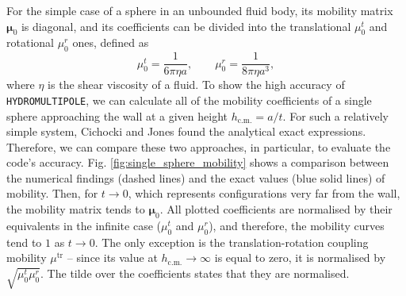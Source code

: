 \documentclass{master_thesis}
\def\code#1{\texttt{#1}}
\begin{document}
For the simple case of a sphere in an unbounded fluid body, its mobility matrix $\boldsymbol{\mu}_0$ is diagonal, and its coefficients can be divided into the translational $\mu^t_0$ and rotational $\mu^r_0$ ones, defined as
\begin{equation}
    \mu^t_0=\frac{1}{6\pi\eta a}, \qquad \mu^r_0=\frac{1}{8\pi\eta a^3},
\label{eqn:sphere_mobility_zero}
\end{equation}
where $\eta$ is the shear viscosity of a fluid. To show the high accuracy of \code{HYDROMULTIPOLE}, we can calculate all of the mobility coefficients of a single sphere approaching the wall at a given height $h_{\textrm{c.m.}}=a/t$. For such a relatively simple system, Cichocki and Jones \cite{cichocki1998} found the analytical exact expressions. Therefore, we can compare these two approaches, in particular, to evaluate the code's accuracy. Fig. \ref{fig:single_sphere_mobility} shows a comparison between the numerical findings (dashed lines) and the exact values (blue solid lines) of mobility. Then, for $t\rightarrow 0$, which represents configurations very far from the wall, the mobility matrix tends to $\bm{\mu}_0$. All plotted coefficients are normalised by their equivalents in the infinite case ($\mu^t_0$ and $\mu^r_0$), and therefore, the mobility curves tend to $1$ as $t\rightarrow 0$. The only exception is the translation-rotation coupling mobility $\mu^{\textrm{tr}}$ -- since its value at $h_{\textrm{c.m.}}\rightarrow \infty$ is equal to zero, it is normalised by $\sqrt{\mu^t_0 \mu^r_0}$. The tilde over the coefficients states that they are normalised.
\end{document}

